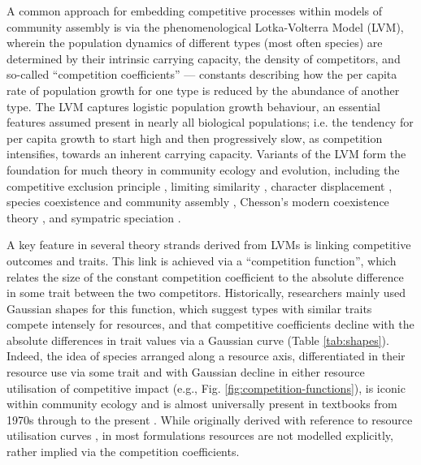 \documentclass[a4paper,11pt]{article}
\begin{document}
A common approach for embedding competitive processes within models of community assembly is via the phenomenological Lotka-Volterra Model (LVM), wherein the  population dynamics of different types (most often species) are determined by their intrinsic carrying capacity, the density of competitors, and so-called ``competition coefficients'' \citep{Lotka-1925, Volterra-1926} --- constants describing how the per capita rate of population growth for one type is reduced by the abundance of another type. The LVM captures logistic population growth behaviour, an essential features assumed present in nearly all biological populations; i.e. the tendency for per capita growth to start high and then progressively slow, as competition intensifies, towards an inherent carrying capacity. Variants of the LVM form the foundation for much theory in community ecology and evolution, including the competitive exclusion principle \citep{Gause-1934}, limiting similarity \citep{MacArthur-1967, May-1972, Slatkin-1980, Abrams-1983}, character displacement \citep{Taper-1985, Case-2000}, species coexistence and community assembly \citep{MacArthur-1967, Calcagno-2006, Leimar-2013, DAndrea-2019}, Chesson's modern coexistence theory \citep{Chesson-2000,Barabas-2018}, and sympatric speciation \citep{Dieckmann-1999}.

A key feature in several theory strands derived from LVMs is linking competitive outcomes and traits. This link is achieved via a ``competition function'', which relates the size of the constant competition coefficient to the absolute difference in some trait between the two competitors. Historically, researchers mainly used Gaussian shapes for this function, which suggest types with similar traits compete intensely for resources, and that competitive coefficients decline with the absolute differences in trait values via a Gaussian curve (Table \ref{tab:shapes}). Indeed, the idea of species arranged along a resource axis, differentiated in their resource use via some trait and with Gaussian decline in either resource utilisation of competitive impact (e.g., Fig. \ref{fig:competition-functions}), is iconic within community ecology and is almost universally present in textbooks from 1970s through to the present \citep[e.g.,][]{Krebs-1972, Ricklefs-1973, Ricklefs-1999, Krebs-2013}. While originally derived with reference to resource utilisation curves \citep{MacArthur-1967, Roughgarden-1979}, in most formulations resources are not modelled explicitly, rather implied via the competition coefficients.
\end{document}
